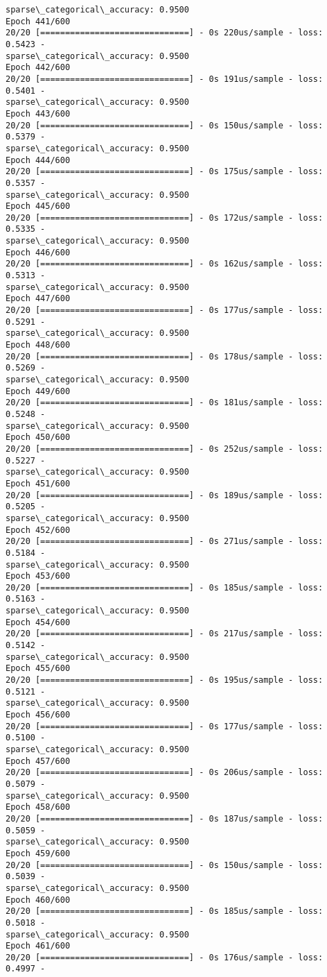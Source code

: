 \documentclass[11pt]{article}
\begin{document}
\begin{Verbatim}[commandchars=\\\{\}]
sparse\_categorical\_accuracy: 0.9500
Epoch 441/600
20/20 [==============================] - 0s 220us/sample - loss: 0.5423 -
sparse\_categorical\_accuracy: 0.9500
Epoch 442/600
20/20 [==============================] - 0s 191us/sample - loss: 0.5401 -
sparse\_categorical\_accuracy: 0.9500
Epoch 443/600
20/20 [==============================] - 0s 150us/sample - loss: 0.5379 -
sparse\_categorical\_accuracy: 0.9500
Epoch 444/600
20/20 [==============================] - 0s 175us/sample - loss: 0.5357 -
sparse\_categorical\_accuracy: 0.9500
Epoch 445/600
20/20 [==============================] - 0s 172us/sample - loss: 0.5335 -
sparse\_categorical\_accuracy: 0.9500
Epoch 446/600
20/20 [==============================] - 0s 162us/sample - loss: 0.5313 -
sparse\_categorical\_accuracy: 0.9500
Epoch 447/600
20/20 [==============================] - 0s 177us/sample - loss: 0.5291 -
sparse\_categorical\_accuracy: 0.9500
Epoch 448/600
20/20 [==============================] - 0s 178us/sample - loss: 0.5269 -
sparse\_categorical\_accuracy: 0.9500
Epoch 449/600
20/20 [==============================] - 0s 181us/sample - loss: 0.5248 -
sparse\_categorical\_accuracy: 0.9500
Epoch 450/600
20/20 [==============================] - 0s 252us/sample - loss: 0.5227 -
sparse\_categorical\_accuracy: 0.9500
Epoch 451/600
20/20 [==============================] - 0s 189us/sample - loss: 0.5205 -
sparse\_categorical\_accuracy: 0.9500
Epoch 452/600
20/20 [==============================] - 0s 271us/sample - loss: 0.5184 -
sparse\_categorical\_accuracy: 0.9500
Epoch 453/600
20/20 [==============================] - 0s 185us/sample - loss: 0.5163 -
sparse\_categorical\_accuracy: 0.9500
Epoch 454/600
20/20 [==============================] - 0s 217us/sample - loss: 0.5142 -
sparse\_categorical\_accuracy: 0.9500
Epoch 455/600
20/20 [==============================] - 0s 195us/sample - loss: 0.5121 -
sparse\_categorical\_accuracy: 0.9500
Epoch 456/600
20/20 [==============================] - 0s 177us/sample - loss: 0.5100 -
sparse\_categorical\_accuracy: 0.9500
Epoch 457/600
20/20 [==============================] - 0s 206us/sample - loss: 0.5079 -
sparse\_categorical\_accuracy: 0.9500
Epoch 458/600
20/20 [==============================] - 0s 187us/sample - loss: 0.5059 -
sparse\_categorical\_accuracy: 0.9500
Epoch 459/600
20/20 [==============================] - 0s 150us/sample - loss: 0.5039 -
sparse\_categorical\_accuracy: 0.9500
Epoch 460/600
20/20 [==============================] - 0s 185us/sample - loss: 0.5018 -
sparse\_categorical\_accuracy: 0.9500
Epoch 461/600
20/20 [==============================] - 0s 176us/sample - loss: 0.4997 -

\end{Verbatim}
\end{document}
